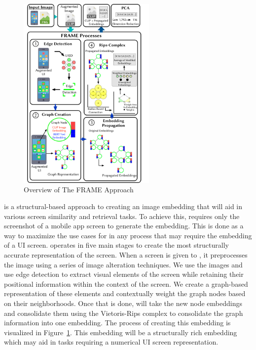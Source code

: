 \begin{figure}[h!]
    \centering
    \includegraphics[width=0.6\textwidth]{imgs/FrameOverview.pdf}
    \caption{Overview of The FRAME Approach}
    \label{Overview}
\end{figure}

\FRAME is a structural-based approach to creating an image embedding that will aid in various screen similarity and retrieval tasks. To achieve this, \FRAME requires only the screenshot of a mobile app screen to generate the embedding. This is done as a way to maximize the use cases for \FRAME in any process that may require the embedding of a UI screen. \FRAME operates in five main stages to create the most structurally accurate representation of the screen. When a screen is given to \FRAME, it preprocesses the image using a series of image alteration techniques. We use the images and use edge detection to extract visual elements of the screen while retaining their positional information within the context of the screen. We create a graph-based representation of these elements and contextually weight the graph nodes based on their neighborhoods. Once that is done, \FRAME will take the new node embeddings and consolidate them using the Vietoris-Rips complex to consolidate the graph information into one embedding. The process of creating this embedding is visualized in Figure~\ref{Overview}. This embedding will be a structurally rich embedding which may aid in tasks requiring a numerical UI screen representation. 

